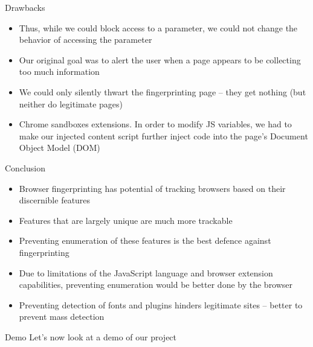 \begin{frame}[fragile,t]{Drawbacks}
	\begin{itemize}
		\item Thus, while we could block access to a parameter, we could not change the behavior of accessing the parameter
		\item Our original goal was to alert the user when a page appears to be collecting too much information
		\item We could only silently thwart the fingerprinting page -- they get nothing (but neither do legitimate pages)
		\item Chrome sandboxes extensions. In order to modify JS variables, we had to make our injected content script further inject code into the page's Document Object Model (DOM)
	\end{itemize}
\end{frame}

\begin{frame}[fragile,t]{Conclusion}
	\begin{itemize}
		\item Browser fingerprinting has potential of tracking browsers based on their discernible features
		\item Features that are largely unique are much more trackable
		\item Preventing enumeration of these features is the best defence against fingerprinting
		\item Due to limitations of the JavaScript language and browser extension capabilities, preventing enumeration would be better done by the browser
		\item Preventing detection of fonts and plugins hinders legitimate sites -- better to prevent mass detection
	\end{itemize}
\end{frame}

\begin{frame}[plain]
	\begin{block}{Demo}
		Let's now look at a demo of our project
	\end{block}
\end{frame}
\addtocounter{framenumber}{-1}

